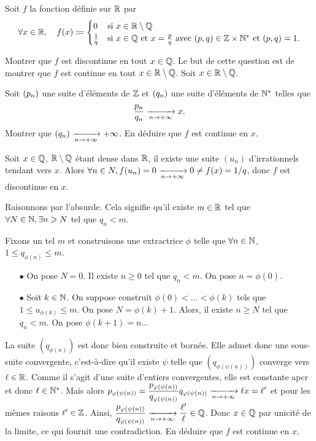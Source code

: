 \documentclass{magnolia}
\begin{document}
Soit $f$ la fonction définie sur $\mathbb{R}$ par
\[\forall x\in\mathbb{R} ,\quad f(x)\coloneqq
  \begin{cases}
  0 & \text{si $x\in\mathbb{R}\setminus\mathbb{Q}$}\\
  \frac{1}{q} & \text{si $x\in\mathbb{Q}$ et $x=\frac{p}{q}$ avec
    $\left(p,q\right)\in\mathbb{Z}\times{\mathbb{N}^*}$ et $\left(p,q\right)=1$.}
  \end{cases}\]
\begin{questions}
\question Montrer que $f$ est discontinue en tout $x\in\mathbb{Q}$.
\question Le but de cette question est de montrer que $f$ est continue en tout
  $x\in\mathbb{R}\setminus\mathbb{Q}$. Soit $x\in\mathbb{R}\setminus\mathbb{Q}$.
  \begin{questions}
  \question Soit $\left(p_n\right)$ une suite d'éléments de $\mathbb{Z}$ et $\left(q_n\right)$ une suite
    d'éléments de ${\mathbb{N}^*}$ telles que
    \[\frac{p_n}{q_n}\xrightarrow[n\rightarrow +\infty]{} x.\]
    Montrer que $\left(q_n\right)\xrightarrow[n\rightarrow +\infty]{}+\infty$.
  \question En déduire que $f$ est continue en $x$.
  \end{questions}
\end{questions}

\begin{sol}
\begin{questions}
\question Soit $x\in \mathbb{Q}$, $\mathbb{R}\setminus\mathbb{Q}$ étant dense dans $\mathbb{R}$, il existe une suite $(u_n)$ d'irrationnels tendant vers $x$. Alors $\forall n \in N, f(u_n)=0\xrightarrow[n\rightarrow +\infty]{}0\neq f(x)=1/q$, donc $f$ est discontinue en $x$.
\question 
  \begin{questions}
  \question Raisonnons par l'absurde. Cela signifie qu'il existe $m\in \mathbb{R}$ tel que $\forall N \in \mathbb{N}, \exists n\geqslant N$ tel que $q_n < m$.

Fixons un tel $m$ et construisons une extractrice $\phi$ telle que $\forall n \in \mathbb{N}$, $1\leq q_{\phi(n)}\leq m$.
\begin{itemize}
\item[$\bullet$] On pose $N=0$. Il existe $n\geq 0$ tel que $q_n<m$. On pose $n=\phi(0)$.
\item[$\bullet$] Soit $k\in \mathbb{N}$. On suppose construit $\phi(0)< \ldots< \phi(k)$ tels que $1\leq u_{\phi(k)}\leq m$.
On pose $N=\phi(k)+1$. Alors, il existe $n\geq N$ tel que $q_n<m$. On pose $\phi(k+1)=n$...
\end{itemize}
La suite $(q_{\phi(n)})$ est donc bien construite et bornée. Elle admet donc une sous-suite convergente, c'est-à-dire qu'il existe $\psi$ telle que $(q_{\phi(\psi(n))})$ converge vers $\ell \in \mathbb{R}$. Comme il s'agit d'une suite d'entiers convergentes, elle est constante apcr et donc $\ell \in {\mathbb{N}^*}$. Mais alors $\displaystyle p_{\varphi(\psi(n))}=\frac{p_{\varphi(\psi(n))}}{q_{\varphi(\psi(n))}}q_{\varphi(\psi(n))} \xrightarrow[n\rightarrow +\infty]{}{\ell x}=\ell'$ et pour les mêmes raisons $\ell' \in \mathbb{Z}$.
Ainsi, $\displaystyle \frac{p_{\varphi(\psi(n))}}{q_{\varphi(\psi(n))}} \xrightarrow[n\rightarrow +\infty]{} \frac{\ell'}{\ell} \in \mathbb{Q}$. Donc $x\in \mathbb{Q}$ par unicité de la limite, ce qui fournit une contradiction.
  \question En déduire que $f$ est continue en $x$.
  \end{questions}
\end{questions}
\end{sol}
\end{document}
